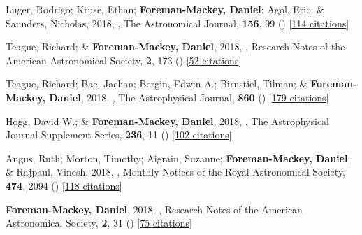 \item[{\color{numcolor}\scriptsize37}] Luger, Rodrigo; Kruse, Ethan; \textbf{Foreman-Mackey, Daniel}; Agol, Eric; \& Saunders, Nicholas, 2018, , The Astronomical Journal, \textbf{156}, 99 () [\href{https://ui.adsabs.harvard.edu/abs/2018AJ....156...99L}{114 citations}]

\item[{\color{numcolor}\scriptsize36}] Teague, Richard; \& \textbf{Foreman-Mackey, Daniel}, 2018, , Research Notes of the American Astronomical Society, \textbf{2}, 173 () [\href{https://ui.adsabs.harvard.edu/abs/2018RNAAS...2..173T}{52 citations}]

\item[{\color{numcolor}\scriptsize35}] Teague, Richard; Bae, Jaehan; Bergin, Edwin A.; Birnstiel, Tilman; \& \textbf{Foreman-Mackey, Daniel}, 2018, , The Astrophysical Journal, \textbf{860} () [\href{https://ui.adsabs.harvard.edu/abs/2018ApJ...860L..12T}{179 citations}]

\item[{\color{numcolor}\scriptsize34}] Hogg, David W.; \& \textbf{Foreman-Mackey, Daniel}, 2018, , The Astrophysical Journal Supplement Series, \textbf{236}, 11 () [\href{https://ui.adsabs.harvard.edu/abs/2018ApJS..236...11H}{102 citations}]

\item[{\color{numcolor}\scriptsize33}] Angus, Ruth; Morton, Timothy; Aigrain, Suzanne; \textbf{Foreman-Mackey, Daniel}; \& Rajpaul, Vinesh, 2018, , Monthly Notices of the Royal Astronomical Society, \textbf{474}, 2094 () [\href{https://ui.adsabs.harvard.edu/abs/2018MNRAS.474.2094A}{118 citations}]

\item[{\color{numcolor}\scriptsize32}] \textbf{Foreman-Mackey, Daniel}, 2018, , Research Notes of the American Astronomical Society, \textbf{2}, 31 () [\href{https://ui.adsabs.harvard.edu/abs/2018RNAAS...2...31F}{75 citations}]

